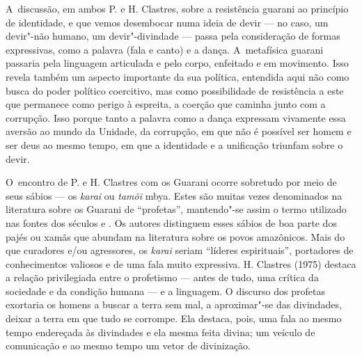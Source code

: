 A~discussão, em ambos P. e H. Clastres, sobre a resistência guarani ao
princípio de identidade, e que vemos desembocar numa ideia de devir ---
no caso, um devir"-não humano, um devir"-divindade --- passa pela
consideração de formas expressivas, como a palavra (fala e canto) e a
dança. A~metafísica guarani passaria pela linguagem articulada e pelo
corpo, enfeitado e em movimento. Isso revela também um aspecto
importante da sua política, entendida aqui não como busca do poder
político coercitivo, mas como possibilidade de resistência a este que
permanece como perigo à espreita, a coerção que caminha junto com a
corrupção. Isso porque tanto a palavra como a dança expressam vivamente
essa aversão ao mundo da Unidade, da corrupção, em que não é possível
ser homem e ser deus ao mesmo tempo, em que a identidade e a unificação
triunfam sobre o devir. 

O~encontro de P. e H. Clastres com os Guarani ocorre sobretudo por meio
de seus sábios --- os \emph{karai} ou \emph{tamõi} mbya. Estes são muitas vezes
denominados na literatura sobre os Guarani de ``profetas'', mantendo"-se
assim o termo utilizado nas fontes dos séculos  e . Os autores
distinguem esses sábios de boa parte dos pajés ou xamãs que abundam na
literatura sobre os povos amazônicos. Mais do que curadores e/ou
agressores, os \emph{karai} seriam ``líderes espirituais'', portadores de
conhecimentos valiosos e de uma fala muito expressiva. H. Clastres
(1975) destaca a relação privilegiada entre o profetismo --- antes de
tudo, uma crítica da sociedade e da condição humana --- e a linguagem. O
discurso dos profetas exortaria os homens a buscar a terra sem mal, a
aproximar"-se das divindades, deixar a terra em que tudo se corrompe.
Ela destaca, pois, uma fala ao mesmo tempo endereçada às divindades e
ela mesma feita divina; um veículo de comunicação e ao mesmo tempo um
vetor de divinização.

